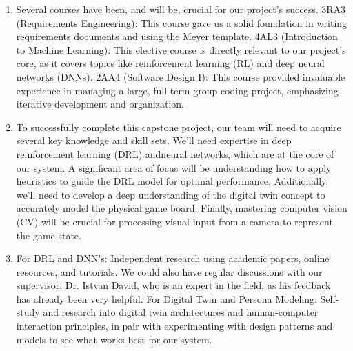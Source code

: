 \documentclass{article}
\begin{document}
\begin{enumerate}
    \item Several courses have been, and will be, crucial for our project's success.
    3RA3 (Requirements Engineering): This course gave us a solid foundation in writing requirements documents and using the Meyer template.
    4AL3 (Introduction to Machine Learning): This elective course is directly relevant to our project's core, as it covers topics like reinforcement learning (RL) and deep neural networks (DNNs).
    2AA4 (Software Design I): This course provided invaluable experience in managing a large, full-term group coding project, emphasizing iterative development and organization.

    \item To successfully complete this capstone project, our team will need to acquire several key knowledge and skill sets.
    We'll need expertise in deep reinforcement learning (DRL) andneural networks, which are at the core of our system.
    A significant area of focus will be understanding how to apply heuristics to guide the DRL model for optimal performance.
    Additionally, we'll need to develop a deep understanding of the digital twin concept to accurately model the physical game board.
    Finally, mastering computer vision (CV) will be crucial for processing visual input from a camera to represent the game state.

    \item For DRL and DNN's: Independent research using academic papers, online resources, and tutorials.
    We could also have regular discussions with our supervisor, Dr. Istvan David, who is an expert in the field, as his feedback has already been very helpful.
    For Digital Twin and Persona Modeling: Self-study and research into digital twin architectures and human-computer interaction principles, in pair with experimenting with design patterns and models to see what works best for our system.

\end{enumerate}
\end{document}
